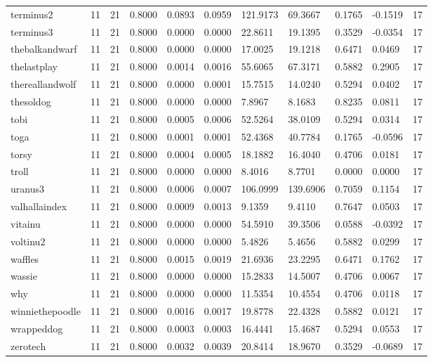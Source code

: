 \begin{table}[htbp]
\begin{tabular}{lllllllllll}
terminus2 & 11 & 21 & 0.8000 & 0.0893 & 0.0959 & 121.9173 & 69.3667 & 0.1765 & -0.1519 & 17 \\
terminus3 & 11 & 21 & 0.8000 & 0.0000 & 0.0000 & 22.8611 & 19.1395 & 0.3529 & -0.0354 & 17 \\
thebalkandwarf & 11 & 21 & 0.8000 & 0.0000 & 0.0000 & 17.0025 & 19.1218 & 0.6471 & 0.0469 & 17 \\
thelastplay & 11 & 21 & 0.8000 & 0.0014 & 0.0016 & 55.6065 & 67.3171 & 0.5882 & 0.2905 & 17 \\
thereallandwolf & 11 & 21 & 0.8000 & 0.0000 & 0.0001 & 15.7515 & 14.0240 & 0.5294 & 0.0402 & 17 \\
thesoldog & 11 & 21 & 0.8000 & 0.0000 & 0.0000 & 7.8967 & 8.1683 & 0.8235 & 0.0811 & 17 \\
tobi & 11 & 21 & 0.8000 & 0.0005 & 0.0006 & 52.5264 & 38.0109 & 0.5294 & 0.0314 & 17 \\
toga & 11 & 21 & 0.8000 & 0.0001 & 0.0001 & 52.4368 & 40.7784 & 0.1765 & -0.0596 & 17 \\
torsy & 11 & 21 & 0.8000 & 0.0004 & 0.0005 & 18.1882 & 16.4040 & 0.4706 & 0.0181 & 17 \\
troll & 11 & 21 & 0.8000 & 0.0000 & 0.0000 & 8.4016 & 8.7701 & 0.0000 & 0.0000 & 17 \\
uranus3 & 11 & 21 & 0.8000 & 0.0006 & 0.0007 & 106.0999 & 139.6906 & 0.7059 & 0.1154 & 17 \\
valhallaindex & 11 & 21 & 0.8000 & 0.0009 & 0.0013 & 9.1359 & 9.4110 & 0.7647 & 0.0503 & 17 \\
vitainu & 11 & 21 & 0.8000 & 0.0000 & 0.0000 & 54.5910 & 39.3506 & 0.0588 & -0.0392 & 17 \\
voltinu2 & 11 & 21 & 0.8000 & 0.0000 & 0.0000 & 5.4826 & 5.4656 & 0.5882 & 0.0299 & 17 \\
waffles & 11 & 21 & 0.8000 & 0.0015 & 0.0019 & 21.6936 & 23.2295 & 0.6471 & 0.1762 & 17 \\
wassie & 11 & 21 & 0.8000 & 0.0000 & 0.0000 & 15.2833 & 14.5007 & 0.4706 & 0.0067 & 17 \\
why & 11 & 21 & 0.8000 & 0.0000 & 0.0000 & 11.5354 & 10.4554 & 0.4706 & 0.0118 & 17 \\
winniethepoodle & 11 & 21 & 0.8000 & 0.0016 & 0.0017 & 19.8778 & 22.4328 & 0.5882 & 0.0121 & 17 \\
wrappeddog & 11 & 21 & 0.8000 & 0.0003 & 0.0003 & 16.4441 & 15.4687 & 0.5294 & 0.0553 & 17 \\
zerotech & 11 & 21 & 0.8000 & 0.0032 & 0.0039 & 20.8414 & 18.9670 & 0.3529 & -0.0689 & 17 \\

\end{tabular}
\end{table}

